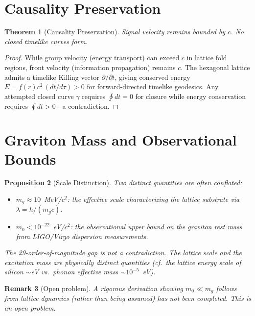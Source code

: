 \documentclass[11pt,letterpaper]{article}
\newtheorem{theorem}{Theorem}[section]
\newtheorem{proposition}[theorem]{Proposition}
\newtheorem{remark}[theorem]{Remark}
\begin{document}
\section{Causality Preservation}

\begin{theorem}[Causality Preservation]
Signal velocity remains bounded by $c$.  No closed timelike curves form.
\end{theorem}

\begin{proof}
While group velocity (energy transport) can exceed $c$ in lattice fold
regions, front velocity (information propagation) remains $c$.  The
hexagonal lattice admits a timelike Killing vector $\partial/\partial t$,
giving conserved energy $E = f(r)c^2\,(dt/d\tau) > 0$ for
forward-directed timelike geodesics.  Any attempted closed curve $\gamma$
requires $\oint dt = 0$ for closure while energy conservation requires
$\oint dt > 0$---a contradiction.
\end{proof}

\section{Graviton Mass and Observational Bounds}\label{sec:graviton}

\begin{proposition}[Scale Distinction]
Two distinct quantities are often conflated:
\begin{itemize}[nosep]
  \item $m_g\approx10$~MeV/$c^2$: the effective scale characterizing
        the lattice substrate via $\lambda = h/(m_g c)$.
  \item $m_0 < 10^{-22}$~eV/$c^2$: the observational upper bound on the
        graviton rest mass from LIGO/Virgo dispersion measurements.
\end{itemize}
The 29-order-of-magnitude gap is not a contradiction.  The lattice scale
and the excitation mass are physically distinct quantities (cf.\ the
lattice energy scale of silicon $\sim$eV vs.\ phonon effective mass
$\sim10^{-5}$~eV).
\end{proposition}

\begin{remark}[Open problem]
A rigorous derivation showing $m_0 \ll m_g$ follows from lattice dynamics
(rather than being assumed) has not been completed.  This is an open problem.
\end{remark}
\end{document}
